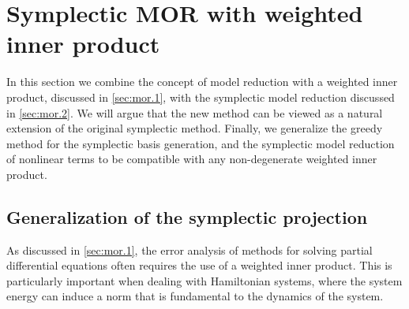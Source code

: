 \section{Symplectic MOR with weighted inner product} \label{sec:normmor}

In this section we combine the concept of model reduction with a weighted inner product, discussed in \cref{sec:mor.1}, with the symplectic model reduction discussed in \cref{sec:mor.2}. We will argue that the new method can be viewed as a natural extension of the original symplectic method. Finally, we generalize the greedy method for the symplectic basis generation, and the symplectic model reduction of nonlinear terms to be compatible with any non-degenerate weighted inner product.

\subsection{Generalization of the symplectic projection} \label{sec:normmor.1}
As discussed in \cref{sec:mor.1}, the error analysis of methods for solving partial differential equations often requires the use of a weighted inner product. This is particularly important when dealing with Hamiltonian systems, where the system energy can induce a norm that is fundamental to the dynamics of the system.

